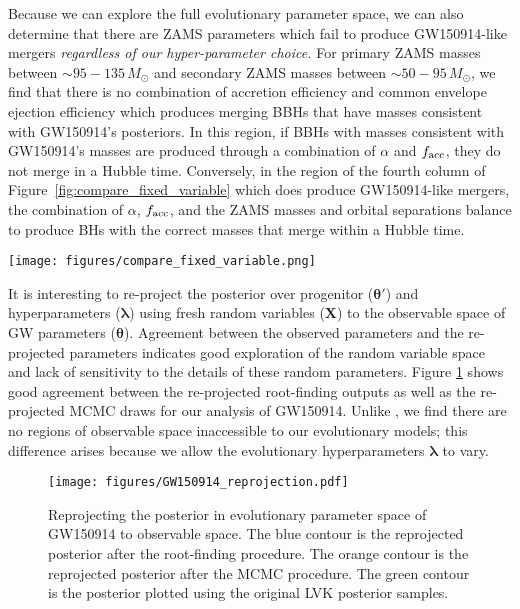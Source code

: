 \documentclass[twocolumn]{aastex631}
\begin{document}
Because we can explore the full evolutionary parameter space, we can also
determine that there are ZAMS parameters which fail to produce GW150914-like
mergers \emph{regardless of our hyper-parameter choice.} For primary ZAMS masses
between $\sim95-135\,M_{\odot}$ and secondary ZAMS masses between
$\sim50-95\,M_{\odot}$, we find that there is no combination of accretion
efficiency and common envelope ejection efficiency which produces merging BBHs
that have masses consistent with GW150914's posteriors. In this region, if BBHs
with masses consistent with GW150914's masses are produced through a combination
of $\alpha$ and $f_{\rm{acc}}$, they do not merge in a Hubble time. Conversely,
in the region of the fourth column of Figure~\ref{fig:compare_fixed_variable}
which does produce GW150914-like mergers, the combination of $\alpha$,
$f_{\rm{acc}}$, and the ZAMS masses and orbital separations balance to produce
BHs with the correct masses that merge within a Hubble time.


\begin{figure*}
    \texttt{[image: figures/compare\_fixed\_variable.png]}
    \caption{Comparison of ZAMS masses for binaries which produce GW150914-like mergers for three variations of $\alpha$
     with fixed set of parameter assumptions matching those of A22 (first three columns) and for binaries which produce
     GW150914-like mergers when $\alpha$, $f_{\mathrm{acc}}$, and $q_{c,3}$ are allowed to vary, (fourth column).}
    \label{fig:compare_fixed_variable}
\end{figure*}

It is interesting to re-project the posterior over progenitor ($\bm{\theta}'$)
and hyperparameters ($\bm{\lambda}$) using fresh random variables ($\bm{X}$) to
the observable space of GW parameters ($\bm{\theta}$).  Agreement between the
observed parameters and the re-projected parameters indicates good exploration
of the random variable space and lack of sensitivity to the details of these
random parameters.  Figure \ref{fig:GW150914_reprojection} shows good agreement
between the re-projected root-finding outputs as well as the re-projected MCMC
draws for our analysis of GW150914.  Unlike \citet{Andrews2021}, we find there
are no regions of observable space inaccessible to our evolutionary models; this
difference arises because we allow the evolutionary hyperparameters
$\bm{\lambda}$ to vary.

\begin{figure}
\texttt{[image: figures/GW150914\_reprojection.pdf]}
\caption{Reprojecting the posterior in evolutionary parameter space of GW150914 to observable space.
The blue contour is the reprojected posterior after the root-finding procedure.
The orange contour is the reprojected posterior after the MCMC procedure.
The green contour is the posterior plotted using the original LVK posterior samples.
}
\label{fig:GW150914_reprojection}
\end{figure}
\end{document}

